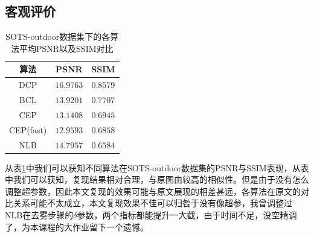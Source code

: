 \subsection{客观评价}

\begin{table}
    \caption{SOTS-outdoor数据集下的各算法平均PSNR以及SSIM对比\label{table-cmp}}
    \centering
    \renewcommand{\arraystretch}{2.5} 
    \begin{tabular}{ccc}
        \toprule
        算法 &  PSNR & SSIM \\
        \midrule
        DCP  & $16.9763$ &   $0.8579$  \\
        BCL  & $13.9201$ & $0.7707$\\
        CEP                 & $13.1408$ & $0.6945$\\
        CEP(fast)           & $12.9593$ & $0.6858$\\
        NLB & $14.7957$ & $0.6584$ \\
        \bottomrule
    \end{tabular}
\end{table}

从表\ref{table-cmp}中我们可以获知不同算法在SOTS-outdoor数据集的PSNR与SSIM表现，从表中我们可以获知，复现结果相对合理，与原图由较高的相似性。但是由于没有怎么调整超参数，因此本文复现的效果可能与原文展现的相差甚远，各算法在原文的对比关系可能不太成立，本文复现效果不佳可以归咎于没有像超参，我曾调整过NLB在去雾步骤的$\delta$参数，两个指标都能提升一大截，由于时间不足，没空精调了，为本课程的大作业留下一个遗憾。

